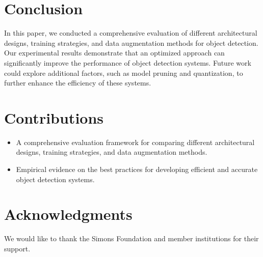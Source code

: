 \documentclass{article}
\begin{document}
\section{Conclusion}
In this paper, we conducted a comprehensive evaluation of different architectural designs, training strategies, and data augmentation methods for object detection. Our experimental results demonstrate that an optimized approach can significantly improve the performance of object detection systems. Future work could explore additional factors, such as model pruning and quantization, to further enhance the efficiency of these systems.

\section{Contributions}
\begin{itemize}
    \item A comprehensive evaluation framework for comparing different architectural designs, training strategies, and data augmentation methods.
    \item Empirical evidence on the best practices for developing efficient and accurate object detection systems.
\end{itemize}

\section*{Acknowledgments}
We would like to thank the Simons Foundation and member institutions for their support.



\end{document}
